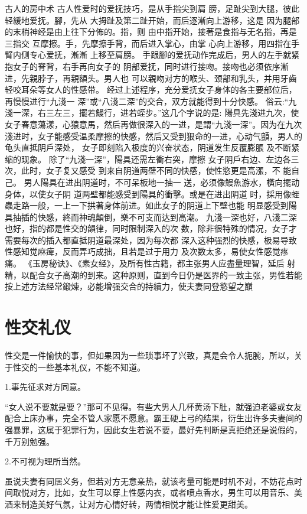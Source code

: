 \documentclass[12pt,UTF8]{ctexbook}
\begin{document}
古人的房中术
古人性爱时的爱抚技巧，是从手指尖到肩
膀，足趾尖到大腿，彼此轻緩地爱抚。腳，先从
大拇趾及第二趾开始，而后逐漸向上游移，这是
因为腿部的末梢神经是由上往下分佈的。指，则
由中指开始，接著是食指与无名指，再是三指交
互摩擦。手，先摩擦手背，而后进入掌心，由掌
心向上游移，用四指在手臂内侧专心爱抚，漸漸
上移至肩膀。
手跟腳的爱抚动作完成后，男人的左手就紧抱女子的脊背，右手再向女子的
阴部爱抚，同时进行接吻。接吻也必须依序漸进，先親脖子，再親額头。男人也
可以親吻对方的喉头、颈部和乳头，并用牙齒轻咬耳朵等女人的性感带。
经过上述程序，充分爱抚女子身体的各主要部位后，再慢慢进行“九淺一
深”或“八淺二深”的交合，双方就能得到十分快感。
俗云:“九淺一深，右三左三，擺若鰻行，进若蛭步。”这几个字说的是:
陽具先淺进九次，使女子春意蕩漾，心猿意馬，然后再做很深入的一进，是謂“九淺一深”。因为在九次淺进时，女子能感受温柔摩擦的快感，然后又受到狠命的一进，心动气顫，男人的龟头直抵阴戶深处，
女子即刻陷入极度的兴奋状态，阴道发生反覆膨脹
及不断紧缩的现象。
除了“九淺一深”，陽具还需左衝右突，摩擦
女子阴戶右边、左边各三次，此时，女子复又感受
到来自阴道两壁不同的快感，使性慾更是高漲，不
能自己。
男人陽具在进出阴道时，不可呆板地一抽一
送，必须像鰻魚游水，橫向擺动身体，以使女子阴
道两壁都能感受到陽具的衝擊。或是在进出阴道
时，採用像蛭蟲走路一般，一上一下拱著身体前进。如此女子的阴道上下壁也能
明显感受到陽具抽插的快感，終而神魂顛倒，樂不可支而达到高潮。
九淺一深也好，八淺二深也好，指的都是性交的韻律，同时限制深入的次
数，除非很特殊的情况，女子才需要每次的插入都直抵阴道最深处，因为每次都
深入这种强烈的快感，极易导致性感知觉麻痺，反而弄巧成拙，且若是过于用力
及次数太多，易使女性感觉疼痛。
《玉房秘诀》、《素女经》，及所有性古籍，都主张男人应盡量理智，延后
射精，以配合女子高潮的到来。这种原则，直到今日仍是医界的一致主张，男性若能按上述方法经常鍛煉，必能增强交合的持續力，使夫妻同登慾望之巔

\chapter{性交礼仪}

性交是一件愉快的事，但如果因为一些琐事坏了兴致，真是会令人扼腕，所以，关于性交的一些基本礼仪，不能不知道。

1.事先征求对方同意。

“女人说不要就是要？”那可不见得。有些大男人几杯黄汤下肚，就强迫老婆或女友配合上床办事，完全不管人家愿不愿意。霸王硬上弓的结果，衍生出许多夫妻间的强暴罪，这属于犯罪行为，因此女生若说不要，最好先判断是真拒绝还是说假的，千万别勉强。

2.不可视为理所当然。

虽说夫妻有同居义务，但若对方无意亲热，就该考量可能是时机不对，不妨花点时间取悦对方，比如，女生可以穿上性感内衣，或者喷点香水，男生可以用音乐、美酒来制造美好气氛，让对方心情好转，两情相悦才能让性爱更甜美。
\end{document}
